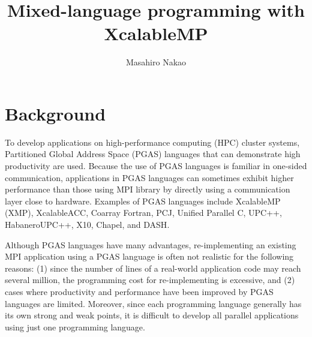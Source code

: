 \documentclass[graybox]{svmult}
\begin{document}
\title*{Mixed-language programming with XcalableMP}
\author{Masahiro Nakao}
%
%
\maketitle



\section{Background}
To develop applications on high-performance computing (HPC) cluster systems,
Partitioned Global Address Space (PGAS) languages that can demonstrate high productivity are used\cite{1303318,Katherine,CGPOP2011,doi:10.1177/1094342017698214}.
Because the use of PGAS languages is familiar in one-sided communication,
applications in PGAS languages can sometimes exhibit higher performance than those using MPI library by directly using a communication layer close to hardware\cite{doi:10.1177/1094342017698214,Jose:2010:UUM:2020373.2020378}. 
Examples of PGAS languages include XcalableMP (XMP)\cite{doi:10.1177/1094342017698214,2013nakao,2012nakao,xmp-spec},
XcalableACC\cite{nakao2014,xacc-spec,nakao2017,nakao2019}, Coarray Fortran\cite{Numrich:1998:CFP:289918.289920}, PCJ\cite{pcj}, Unified Parallel C\cite{upc-1.3},
UPC++\cite{upc_plus_plus}, HabaneroUPC++\cite{Kumar:2014:HCP:2676870.2676879}, X10\cite{Charles:2005:XOA:1103845.1094852},
Chapel\cite{Chamberlain:2007:PPC:1286120.1286123}, and DASH\cite{DBLP:journals/corr/FurlingerFK16}.

Although PGAS languages have many advantages,
re-implementing an existing MPI application using a PGAS language is often not realistic for the following reasons:
(1) since the number of lines of a real-world application code may reach several million, the programming cost for re-implementing is excessive, and
(2) cases where productivity and performance have been improved by PGAS languages are limited.
Moreover, since each programming language generally has its own strong and weak points, it is difficult to develop all parallel applications using just one programming language.
\end{document}
